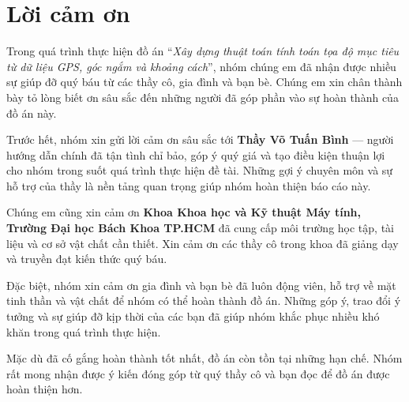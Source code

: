 \section*{Lời cảm ơn}
\thispagestyle{empty}


Trong quá trình thực hiện đồ án “\textit{Xây dựng thuật toán tính toán tọa độ mục tiêu từ dữ liệu GPS, góc ngắm và khoảng cách}”, nhóm chúng em đã nhận được nhiều sự giúp đỡ quý báu từ các thầy cô, gia đình và bạn bè. Chúng em xin chân thành bày tỏ lòng biết ơn sâu sắc đến những người đã góp phần vào sự hoàn thành của đồ án này.

Trước hết, nhóm xin gửi lời cảm ơn sâu sắc tới \textbf{Thầy Võ Tuấn Bình} — người hướng dẫn chính đã tận tình chỉ bảo, góp ý quý giá và tạo điều kiện thuận lợi cho nhóm trong suốt quá trình thực hiện đề tài. Những gợi ý chuyên môn và sự hỗ trợ của thầy là nền tảng quan trọng giúp nhóm hoàn thiện báo cáo này.

Chúng em cũng xin cảm ơn \textbf{Khoa Khoa học và Kỹ thuật Máy tính, Trường Đại học Bách Khoa TP.HCM} đã cung cấp môi trường học tập, tài liệu và cơ sở vật chất cần thiết. Xin cảm ơn các thầy cô trong khoa đã giảng dạy và truyền đạt kiến thức quý báu.

Đặc biệt, nhóm xin cảm ơn gia đình và bạn bè đã luôn động viên, hỗ trợ về mặt tinh thần và vật chất để nhóm có thể hoàn thành đồ án. Những góp ý, trao đổi ý tưởng và sự giúp đỡ kịp thời của các bạn đã giúp nhóm khắc phục nhiều khó khăn trong quá trình thực hiện.

Mặc dù đã cố gắng hoàn thành tốt nhất, đồ án còn tồn tại những hạn chế. Nhóm rất mong nhận được ý kiến đóng góp từ quý thầy cô và bạn đọc để đồ án được hoàn thiện hơn.


\clearpage
{}
